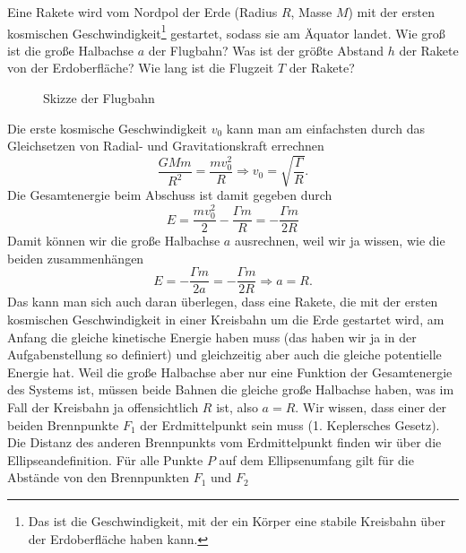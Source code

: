 \begin{Exercise}[title = Ballistische Rakete, origin = J. Kaalda, difficulty =3, label = cmellipse]
	Eine Rakete wird vom Nordpol der Erde (Radius $R$, Masse $M$) mit der ersten kosmischen Geschwindigkeit\footnote[2]{Das ist die Geschwindigkeit, mit der ein Körper eine stabile Kreisbahn über der Erdoberfläche haben kann.} gestartet, sodass sie am Äquator landet. 
	\Question Wie groß ist die große Halbachse $a$ der Flugbahn?
	\Question Was ist der größte Abstand $h$ der Rakete von der Erdoberfläche?
	\Question Wie lang ist die Flugzeit $T$ der Rakete?
\end{Exercise}
\begin{Answer}[ref = cmellipse]
	\begin{figure}[h]
		\centering
		
		\caption{Skizze der Flugbahn}
		\label{fig:cmellsk}
	\end{figure}
	\Question Die erste kosmische Geschwindigkeit $v_0$ kann man am einfachsten durch das Gleichsetzen von  Radial- und Gravitationskraft errechnen
	\begin{equation*}\label{cmellipse:vo}
		\frac{GMm}{R^2} = \frac{mv_0^2}{R} \Rightarrow v_0 = \sqrt{\frac{\Gamma}{R}}.
	\end{equation*}
	Die Gesamtenergie beim Abschuss ist damit gegeben durch
	\begin{equation*}
		E = \frac{mv_0^2}{2} - \frac{\Gamma m}{R} = -\frac{\Gamma m}{2R}
	\end{equation*}
	Damit können wir die große Halbachse $a$ ausrechnen, weil wir ja wissen, wie die beiden zusammenhängen
	\begin{equation}\label{cmellipse:sma}
	\boxed{
		E = -\frac{\Gamma m}{2a} = -\frac{\Gamma m}{2R} \Rightarrow a = R.}
	\end{equation}
	Das kann man sich auch daran überlegen, dass eine Rakete, die mit der ersten kosmischen Geschwindigkeit in einer Kreisbahn um die Erde gestartet wird, am Anfang die gleiche kinetische Energie haben muss (das haben wir ja in der Aufgabenstellung so definiert) und gleichzeitig aber auch die gleiche potentielle Energie hat. Weil die große Halbachse aber nur eine Funktion der Gesamtenergie des Systems ist, müssen beide Bahnen die gleiche große Halbachse haben, was im Fall der Kreisbahn ja offensichtlich $R$ ist, also $a = R$.
 	\Question Wir wissen, dass einer der beiden Brennpunkte $F_1$ der Erdmittelpunkt sein muss (1. Keplersches Gesetz). Die Distanz des anderen Brennpunkts vom Erdmittelpunkt finden wir über die Ellipseandefinition. Für alle Punkte $P$ auf dem Ellipsenumfang gilt für die Abstände von den Brennpunkten $F_1$ und $F_2$

\end{Answer}
